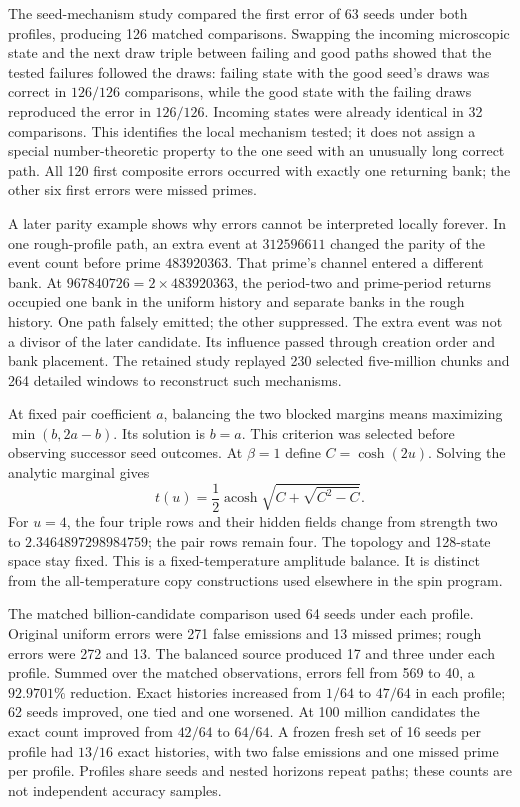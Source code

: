 The seed-mechanism study compared the first error of 63 seeds under both profiles, producing 126 matched comparisons. Swapping the incoming microscopic state and the next draw triple between failing and good paths showed that the tested failures followed the draws: failing state with the good seed's draws was correct in $126/126$ comparisons, while the good state with the failing draws reproduced the error in $126/126$. Incoming states were already identical in 32 comparisons. This identifies the local mechanism tested; it does not assign a special number-theoretic property to the one seed with an unusually long correct path. All 120 first composite errors occurred with exactly one returning bank; the other six first errors were missed primes.

A later parity example shows why errors cannot be interpreted locally forever. In one rough-profile path, an extra event at $312596611$ changed the parity of the event count before prime $483920363$. That prime's channel entered a different bank. At $967840726=2\times483920363$, the period-two and prime-period returns occupied one bank in the uniform history and separate banks in the rough history. One path falsely emitted; the other suppressed. The extra event was not a divisor of the later candidate. Its influence passed through creation order and bank placement. The retained study replayed 230 selected five-million chunks and 264 detailed windows to reconstruct such mechanisms.

At fixed pair coefficient $a$, balancing the two blocked margins means maximizing $\min(b,2a-b)$. Its solution is $b=a$. This criterion was selected before observing successor seed outcomes. At $\beta=1$ define $C=\cosh(2u)$. Solving the analytic marginal gives
\[
 t(u)=\frac12\operatorname{acosh}
       \sqrt{C+\sqrt{C^2-C}}.
\]
For $u=4$, the four triple rows and their hidden fields change from strength two to $2.3464897298984759$; the pair rows remain four. The topology and 128-state space stay fixed. This is a fixed-temperature amplitude balance. It is distinct from the all-temperature copy constructions used elsewhere in the spin program.

The matched billion-candidate comparison used 64 seeds under each profile. Original uniform errors were 271 false emissions and 13 missed primes; rough errors were 272 and 13. The balanced source produced 17 and three under each profile. Summed over the matched observations, errors fell from 569 to 40, a $92.9701\%$ reduction. Exact histories increased from $1/64$ to $47/64$ in each profile; 62 seeds improved, one tied and one worsened. At 100 million candidates the exact count improved from $42/64$ to $64/64$. A frozen fresh set of 16 seeds per profile had $13/16$ exact histories, with two false emissions and one missed prime per profile. Profiles share seeds and nested horizons repeat paths; these counts are not independent accuracy samples.

